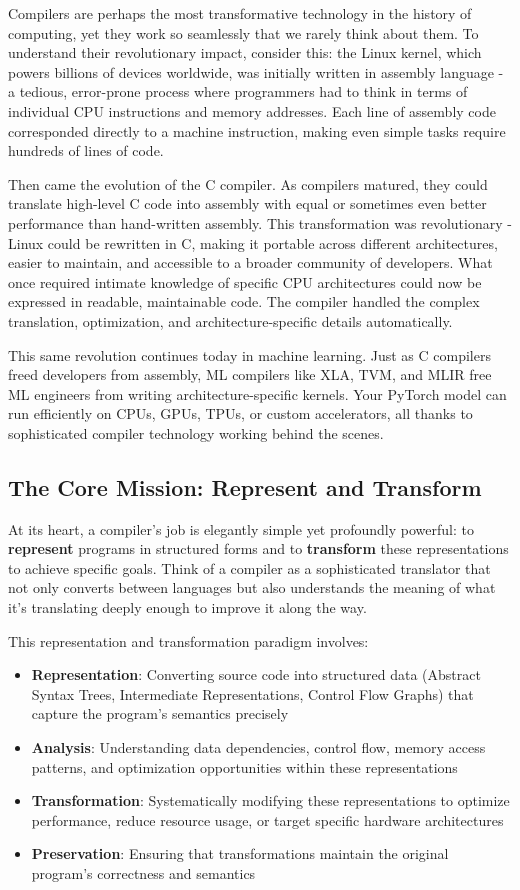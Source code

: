 \documentclass[11pt,a4paper]{article}
\begin{document}
Compilers are perhaps the most transformative technology in the history of computing, yet they work so seamlessly that we rarely think about them. To understand their revolutionary impact, consider this: the Linux kernel, which powers billions of devices worldwide, was initially written in assembly language - a tedious, error-prone process where programmers had to think in terms of individual CPU instructions and memory addresses. Each line of assembly code corresponded directly to a machine instruction, making even simple tasks require hundreds of lines of code.

Then came the evolution of the C compiler. As compilers matured, they could translate high-level C code into assembly with equal or sometimes even better performance than hand-written assembly. This transformation was revolutionary - Linux could be rewritten in C, making it portable across different architectures, easier to maintain, and accessible to a broader community of developers. What once required intimate knowledge of specific CPU architectures could now be expressed in readable, maintainable code. The compiler handled the complex translation, optimization, and architecture-specific details automatically.

This same revolution continues today in machine learning. Just as C compilers freed developers from assembly, ML compilers like XLA, TVM, and MLIR free ML engineers from writing architecture-specific kernels. Your PyTorch model can run efficiently on CPUs, GPUs, TPUs, or custom accelerators, all thanks to sophisticated compiler technology working behind the scenes.

\subsection{The Core Mission: Represent and Transform}

At its heart, a compiler's job is elegantly simple yet profoundly powerful: to \textbf{represent} programs in structured forms and to \textbf{transform} these representations to achieve specific goals. Think of a compiler as a sophisticated translator that not only converts between languages but also understands the meaning of what it's translating deeply enough to improve it along the way.

This representation and transformation paradigm involves:
\begin{itemize}
    \item \textbf{Representation}: Converting source code into structured data (Abstract Syntax Trees, Intermediate Representations, Control Flow Graphs) that capture the program's semantics precisely
    \item \textbf{Analysis}: Understanding data dependencies, control flow, memory access patterns, and optimization opportunities within these representations
    \item \textbf{Transformation}: Systematically modifying these representations to optimize performance, reduce resource usage, or target specific hardware architectures
    \item \textbf{Preservation}: Ensuring that transformations maintain the original program's correctness and semantics
\end{itemize}
\end{document}
